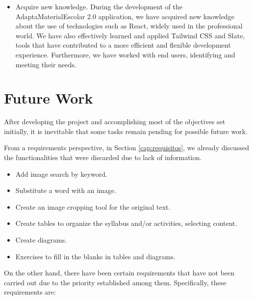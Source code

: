 \begin{itemize}
    \item  Acquire new knowledge. During the development of the AdaptaMaterialEscolar 2.0 application, we have acquired new knowledge about the use of technologies such as React, widely used in the professional world. We have also effectively learned and applied Tailwind CSS and Slate, tools that have contributed to a more efficient and flexible development experience. Furthermore, we have worked with end users, identifying and meeting their needs.
\end{itemize}


\section{Future Work}
\label{sec:FutureWork}
After developing the project and accomplishing most of the objectives set initially, it is inevitable that some tasks remain pending for possible future work.

From a requirements perspective, in Section \ref{cap:requisitos}, we already discussed the functionalities that were discarded due to lack of information.

\begin{itemize}
    \item Add image search by keyword.
    \item Substitute a word with an image.
    \item Create an image cropping tool for the original text.
    \item Create tables to organize the syllabus and/or activities, selecting content.
    \item Create diagrams.
    \item Exercises to fill in the blanks in tables and diagrams.
\end{itemize}

On the other hand, there have been certain requirements that have not been carried out due to the priority established among them. Specifically, these requirements are:

